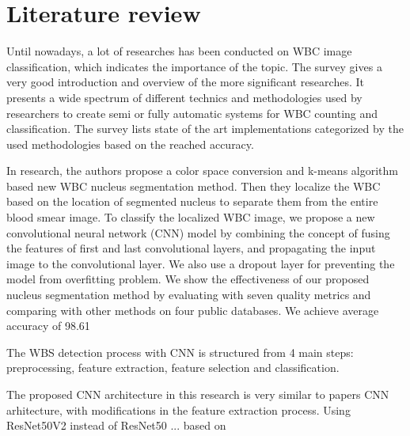 \section{Literature review}
Until nowadays, a lot of researches has been conducted on WBC image classification, which indicates the importance of the topic.
The 
survey gives a very good introduction and overview of the more significant researches. It presents a wide spectrum of different technics and methodologies used by researchers to create semi or fully automatic systems for WBC counting and classification. The survey lists state of the art implementations categorized by the used methodologies based on the reached accuracy.


In %
research, the authors propose a color space conversion and k-means algorithm based new WBC nucleus segmentation method. Then they localize the WBC based on the location of segmented nucleus to separate them from the entire blood smear image. To classify the localized WBC image, we propose a new convolutional neural network (CNN) model by combining the concept of fusing the features of first and last convolutional layers, and propagating the input image to the convolutional layer. We also use a dropout layer for preventing the model from overfitting problem. We show the effectiveness of our proposed nucleus segmentation method by evaluating with seven quality metrics and comparing with other methods on four public databases. We achieve average accuracy of 98.61%

The WBS detection process with CNN is structured from 4 main steps: preprocessing, feature extraction, feature selection and classification.

The proposed CNN architecture in this research is very similar to
papers CNN arhitecture, with modifications in the feature extraction process. Using ResNet50V2 instead of ResNet50 ... based on



